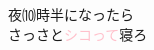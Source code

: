 \documentclass[tate]{ltjarticle}
\begin{document}
\setlength{\baselineskip}{100pt}
\setlength{\parindent}{0em}

\centering




夜⑽時半になったら\\
さっさと\textcolor{pink}{シコって}寝ろ\\

\end{document}
